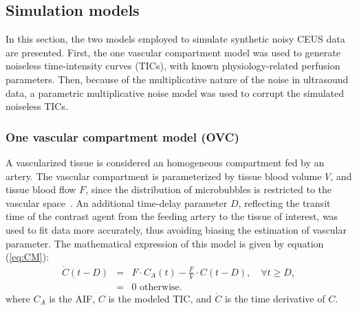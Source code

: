 \subsection{Simulation models}
In this section, the two models employed to simulate synthetic noisy CEUS data are presented.
First, the one vascular compartment model was used to generate noiseless time-intensity curves (TICs), with known physiology-related perfusion parameters.
Then, because of the multiplicative nature of the noise in ultrasound data, a parametric multiplicative noise model was used to corrupt the simulated noiseless TICs. 

\subsubsection{One vascular compartment model (OVC)}
\label{sec:OVCModel}
A vascularized tissue is considered an homogeneous compartment fed by an artery.
The vascular compartment is parameterized by tissue blood volume $V$, and tissue blood flow $F$, since the distribution of microbubbles is restricted to the vascular space~\cite{Gunn2001cx,Doury2016wn}.
An additional time-delay parameter $D$, reflecting the transit time of the contrast agent from the feeding artery to the tissue of interest, was used to fit data more accurately, thus avoiding biasing the estimation of vascular parameter. 
The mathematical expression of this model is given by equation (\ref{eq:CM}):
\begin{equation}
\begin{array}{rcl}
\dot{C} \left( t - D \right) &=& F \cdot C_A \left( t \right) - \frac{F}{V} \cdot C \left( t - D \right), \quad \forall t \geq D,  \\
 &=& 0 \textrm{ otherwise.}
\end{array}
\label{eq:CM}
\end{equation}
where $C_A$ is the AIF, $C$ is the modeled TIC, and $\dot{C}$ is the time derivative of $C$.

